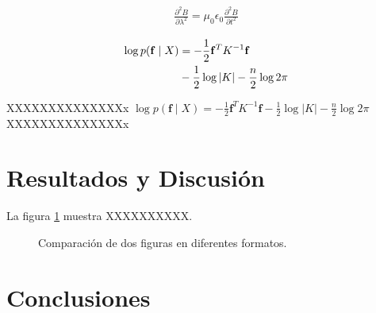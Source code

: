 \documentclass[]{article}
\begin{document}
\begin{align}
\frac{\partial^{2} B}{\partial \lambda^{2}}=\mu_{0} \epsilon_{0} \frac{\partial^{2} B}{\partial t^{2}}
\end{align}

\begin{align}
\log p(\mathbf{f} \mid X) &=-\frac{1}{2} \mathbf{f}^{T} K^{-1} \mathbf{f}  \notag\\
 &-\frac{1}{2} \log |K|-\frac{n}{2} \log 2 \pi
\end{align}

XXXXXXXXXXXXXXx $\log p(\mathbf{f} \mid X)=-\frac{1}{2} \mathbf{f}^{T} K^{-1} \mathbf{f}-\frac{1}{2} \log |K|-\frac{n}{2} \log 2 \pi$ XXXXXXXXXXXXXXx

\section{Resultados y Discusión}

La figura \ref{fig:Comparacion} muestra XXXXXXXXXX.

\begin{figure}
	\centering
	\caption{Comparación de dos figuras en diferentes formatos.}
	\label{fig:Comparacion}
\end{figure}

\section{Conclusiones}




\end{document}

